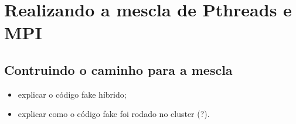 \section{Realizando a mescla de Pthreads e MPI}

\subsection{Contruindo o caminho para a mescla}

\begin{itemize}
	\item explicar o código fake híbrido;
	\item explicar como o código fake foi rodado no cluster (?).
\end{itemize}